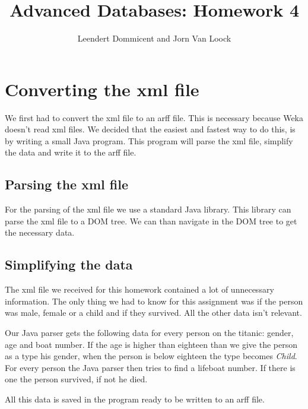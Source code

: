 \documentclass[a4]{article}
\title{Advanced Databases: Homework 4}
\author{Leendert Dommicent and Jorn Van Loock}
\begin{document}
\maketitle
\setlength{\parskip}{5pt}
\setlength{\parindent}{0pt}
\section{Converting the xml file}
We first had to convert the xml file to an arff file. This is necessary because Weka doesn't read xml files. We decided that the easiest and fastest way to do this, is by writing a small Java program. This program will parse the xml file, simplify the data and write it to the arff file.
\subsection{Parsing the xml file}
For the parsing of the xml file we use a standard Java library. This library can parse the xml file to a DOM tree. We can than navigate in the DOM tree to get the necessary data.
\subsection{Simplifying the data}
The xml file we received for this homework contained a lot of unnecessary information. The only thing we had to know for this assignment was if the person was male, female or a child and if they survived. All the other data isn't relevant.\par
Our Java parser gets the following data for every person on the titanic: gender, age and boat number. If the age is higher than eighteen than we give the person as a type his gender, when the person is below eighteen the type becomes \textit{Child}. For every person the Java parser then tries to find a lifeboat number. If there is one the person survived, if not he died.\par
All this data is saved in the program ready to be written to an arff file.
\end{document}
